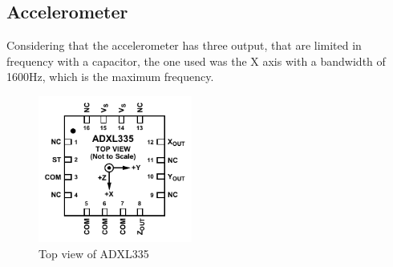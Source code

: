 \subsection{Accelerometer}
Considering that the accelerometer has three output, that are limited in frequency with a capacitor, the one used was the X axis with a bandwidth of 1600Hz, which is the maximum frequency.
\begin{figure}[]
    \centering
    \includegraphics[width=0.45\textwidth]{Chapters/4CHP/Figures/accTopView.pdf}
    \caption{Top view of ADXL335}
    \label{fig:topViewADXL}
\end{figure}

